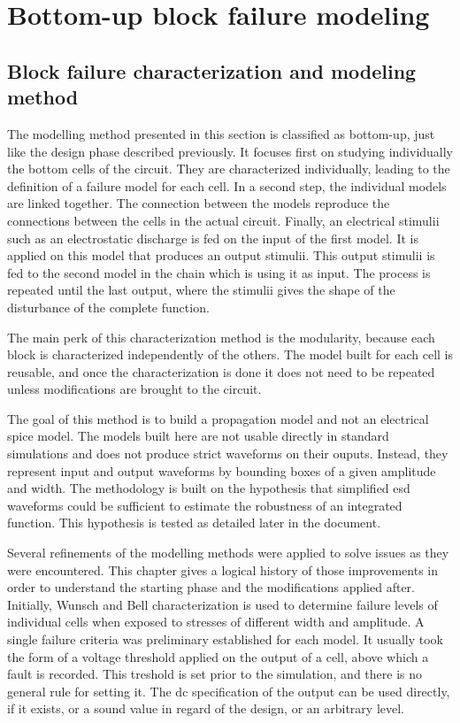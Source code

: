 \section{Bottom-up block failure modeling}
\label{sec:bottom-up-modeling}

\subsection{Block failure characterization and modeling method}
\label{sec:block-failure-cz}

The modelling method presented in this section is classified as bottom-up, just like the design phase described previously.
It focuses first on studying individually the bottom cells of the circuit.
They are characterized individually, leading to the definition of a failure model for each cell.
In a second step, the individual models are linked together.
The connection between the models reproduce the connections between the cells in the actual circuit.
Finally, an electrical stimulii such as an electrostatic discharge is fed on the input of the first model.
It is applied on this model that produces an output stimulii.
This output stimulii is fed to the second model in the chain which is using it as input.
The process is repeated until the last output, where the stimulii gives the shape of the disturbance of the complete function.

The main perk of this characterization method is the modularity, because each block is characterized independently of the others.
The model built for each cell is reusable, and once the characterization is done it does not need to be repeated unless modifications are brought to the circuit.

The goal of this method is to build a propagation model and not an electrical \gls{spice} model.
The models built here are not usable directly in standard simulations and does not produce strict waveforms on their ouputs.
Instead, they represent input and output waveforms by bounding boxes of a given amplitude and width.
The methodology is built on the hypothesis that simplified \gls{esd} waveforms could be sufficient to estimate the robustness of an integrated function.
This hypothesis is tested as detailed later in the document.

Several refinements of the modelling methods were applied to solve issues as they were encountered.
This chapter gives a logical history of those improvements in order to understand the starting phase and the modifications applied after.
Initially, Wunsch and Bell characterization \cite{wunsch-bell} is used to determine failure levels of individual cells when exposed to stresses of different width and amplitude.
A single failure criteria was preliminary established for each model.
It usually took the form of a voltage threshold applied on the output of a cell, above which a fault is recorded.
This treshold is set prior to the simulation, and there is no general rule for setting it.
The \gls{dc} specification of the output can be used directly, if it exists, or a sound value in regard of the design, or an arbitrary level.

